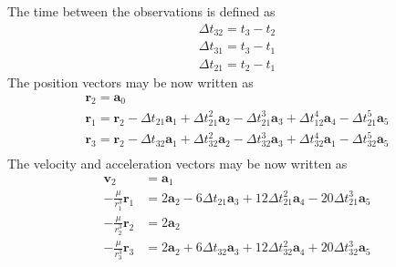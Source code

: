 \documentclass[12pt]{article}
\begin{document}
	The time between the observations is defined as 
	\begin{equation}
	\begin{array} { l } { \Delta t _ { 32 } = t _ { 3 } - t _ { 2 } } \\ { \Delta t _ { 31 } = t _ { 3 } - t _ { 1 } } \\ { \Delta t _ { 21 } = t _ { 2 } - t _ { 1 } } \end{array}
	\end{equation}
	The position vectors may be now written as 
	\begin{equation}
	\begin{array} { l }
	{ \mathbf { r } _ { 2 } = \mathbf { a } _ { 0 } } \\ 
	 { \mathbf { r } _ { 1 } = \mathbf { r } _ { 2 } - \Delta t _ { 21 } \mathbf { a } _ { 1 } + \Delta t _ { 21 } ^ { 2 } \mathbf { a } _ { 2 } - \Delta t _ { 21 } ^ { 3 } \mathbf { a } _ { 3 } + \Delta t _ { 12 } ^ { 4 } \mathbf { a } _ { 4 } - \Delta t _ { 21 } ^ { 5 } \mathbf { a } _ { 5 } } \\ 
	
	{ \mathbf { r } _ { 3 } = \mathbf { r } _ { 2 } - \Delta t _ { 32 } \mathbf { a } _ { 1 } + \Delta t _ { 32 } ^ { 2 } \mathbf { a } _ { 2 } - \Delta t _ { 32 } ^ { 3 } \mathbf { a } _ { 3 } + \Delta t _ { 32 } ^ { 4 } \mathbf { a } _ { 1 } - \Delta t _ { 32 } ^ { 5 } \mathbf { a } _ { 5 } } \\ 	
	\end{array}
	\end{equation}
	The velocity and acceleration vectors may be now written as
	 \begin{equation}
	 \begin{aligned} \mathbf { v } _ { 2 } & = \mathbf { a } _ { 1 } \\ - \frac { \mu } { r _ { 1 } ^ { 3 } } \mathbf { r } _ { 1 } & = 2 \mathbf { a } _ { 2 } - 6 \Delta t _ { 21 } \mathbf { a } _ { 3 } + 12 \Delta t _ { 21 } ^ { 2 } \mathbf { a } _ { 4 } - 20 \Delta t _ { 21 } ^ { 3 } \mathbf { a } _ { 5 } \\ - \frac { \mu } { r _ { 2 } ^ { 3 } } \mathbf { r } _ { 2 } & = 2 \mathbf { a } _ { 2 } \\ - \frac { \mu } { r _ { 3 } ^ { 3 } } \mathbf { r } _ { 3 } & = 2 \mathbf { a } _ { 2 } + 6 \Delta t _ { 32 } \mathbf { a } _ { 3 } + 12 \Delta t _ { 32 } ^ { 2 } \mathbf { a } _ { 4 } + 20 \Delta t _ { 32 } ^ { 3 } \mathbf { a } _ { 5 } \end{aligned}
	 \end{equation}
	
\end{document}
